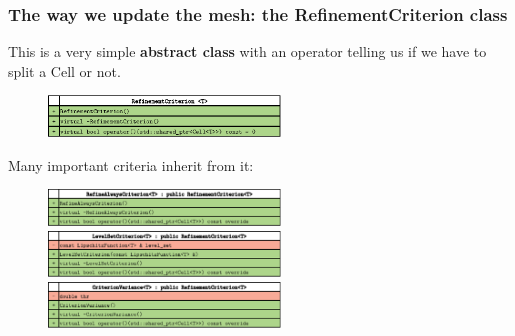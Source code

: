 \documentclass[8pt]{beamer}
\begin{document}
\begin{frame}
 \frametitle{The way we update the mesh: the RefinementCriterion class}
This is a very simple \textbf{abstract class} with an operator telling us if we have to split a Cell or not.
\begin{figure}[!h]
\begin{center}
\includegraphics[width=0.55\textwidth]{./figures/refinementcriterion_h.eps}
\end{center}
\end{figure}
Many important criteria inherit from it:
\begin{figure}[!h]
\begin{center}
\includegraphics[width=0.55\textwidth]{./figures/RefineAlwaysCriterion_h.eps}
\includegraphics[width=0.55\textwidth]{./figures/LevelSetCriterion_h.eps}
\includegraphics[width=0.55\textwidth]{./figures/CriterionVariance_h.eps}
\end{center}
\end{figure}
\end{frame}
\end{document}
